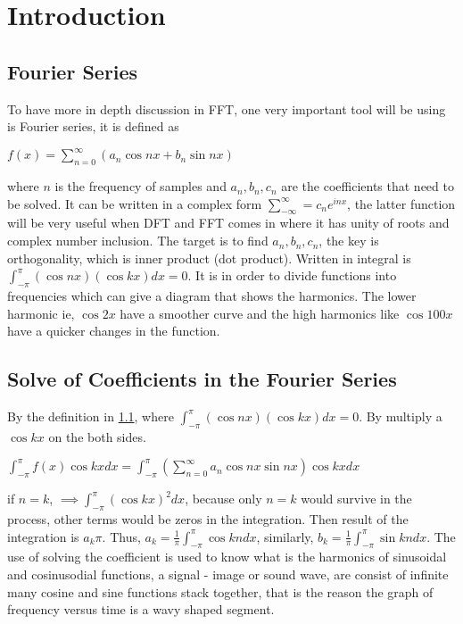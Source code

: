 \documentclass[12pt]{article}
\begin{document}
	
	\pagebreak
	\section{Introduction}
		
		\subsection{Fourier Series} \label{subsec:1.1}
			
			To have more in depth discussion in FFT, one very important tool will be using is Fourier series, it is defined as 
			\begin{center}
			\centering
				$f(x) = \sum_{n=0}^{\infty}(a_{n}\cos nx + b_{n}\sin nx) $ 
			\end{center}
			where $n$ is the frequency of samples and $a_{n}, b_{n}, c_{n}$ are the coefficients that need to be solved. It can be written in a complex form $\sum_{-\infty}^{\infty} = c_{n} e^{inx}$, the latter function will be very useful when DFT and FFT comes in where it has unity of roots and complex number inclusion. The target is to find $a_{n}, b_{n}, c_{n}$, the key is orthogonality, which is inner product (dot product). Written in integral is $\int_{-\pi}^{\pi}(\cos nx)(\cos kx) dx = 0$. It is in order to divide functions into frequencies which can give a diagram that shows the harmonics. The lower harmonic ie, $\cos 2x$ have a smoother curve and the high harmonics like $\cos 100x$ have a quicker changes in the function.  
			
		\subsection{Solve of Coefficients in the Fourier Series}
			By the definition in \ref{subsec:1.1}, where $\int_{-\pi}^{\pi}(\cos nx)(\cos kx) dx = 0$. By multiply a $\cos kx$ on the both sides. 
			
			\begin{center}
				\centering
				$\int_{-\pi}^{\pi} f(x) \cos kx dx = \int_{-\pi}^{\pi} (\sum_{n=0}^{\infty} a_{n} \cos nx \sin nx) \cos kx dx$
			\end{center}
		
			if $n = k$, $\implies \int_{-\pi}^{\pi} (\cos kx)^{2} dx$, because only $n = k$ would survive in the process, other terms would be zeros in the integration. Then result of the integration is $a_{k}\pi$. Thus, $a_{k} = \frac{1}{\pi} \int_{-\pi}^{\pi} \cos kn dx$, similarly, $b_{k} = \frac{1}{\pi} \int_{-\pi}^{\pi} \sin kn dx$.
			The use of solving the coefficient is used to know what is the harmonics of sinusoidal and cosinusodial functions, a signal - image or sound wave, are consist of infinite many cosine and sine functions stack together, that is the reason the graph of frequency versus time is a wavy shaped segment.
			
\end{document}
